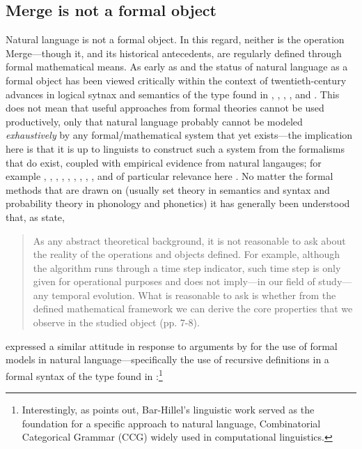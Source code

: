 \documentclass[11pt,twoside]{article}
\theoremstyle{plain}
\numberwithin{equation}{section}
\theoremstyle{definition}
\newtheorem{phrase string}{Phrase String}
\begin{document}
\subsection{Merge is not a formal object}
Natural language is not a formal object. In this regard, neither is the operation Merge---though it, and its historical antecedents, are regularly defined through formal mathematical means. As early as \cite{chomsky55logicalsyntax} and \cite{chomsky57ss} the status of natural language as a formal object has been viewed critically within the context of twentieth-century advances in logical sytnax and semantics of the type found in \cite{carnap:1937}, \cite{ayer:1936}, \cite{riechenbach:1947}, \cite{quine:1953}, and \cite{tarski:1956}. This does not mean that useful approaches from formal theories cannot be used productively, only that natural language {probably} cannot be modeled \textsl{exhaustively} by any formal/mathematical system that yet exists---the implication here is that it is up to linguists to construct such a system from the formalisms that do exist, coupled with empirical evidence from natural langauges; for example \cite{langpostal:1984}, \cite{pmw:1990}, \cite{hornstein:1992}, \cite{prsmol:1993}, \cite{uriagereka:1998}, \cite{chmg:2000}, \cite{tessmol:2000}, \cite{bhj:2003}, \cite{niyogi:2006}, and of particular relevance here \cite{fortcm:toappear}. No matter the formal methods that are drawn on (usually set theory in semantics and syntax and probability theory in phonology and phonetics) it has generally been understood that, as \citep[7-8]{fortcm:toappear} state,

\begin{quotation}
As any abstract theoretical background, it is not reasonable to ask about
the reality of the operations and objects defined. For example, although the algorithm runs
through a time step indicator, such time step is only given for operational purposes and does not
imply---in our field of study---any temporal evolution. What is reasonable to ask is whether from
the defined mathematical framework we can derive the core properties that we observe in the
studied object (pp. 7-8). 
\end{quotation}

\citep[45]{chomsky55logicalsyntax} expressed a similar attitude in response to arguments by \cite{barhillel:1954} for the use of formal models in natural language---specifically the use of recursive definitions in a formal syntax of the type found in \cite{carnap:1937}:\footnote{Interestingly, as \cite{tomalin:2006} points out, Bar-Hillel's linguistic work served as the foundation for a specific approach to natural language, Combinatorial Categorical Grammar (CCG) widely used in computational linguistics.} 
\end{document}
